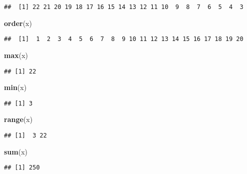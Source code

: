 \documentclass[
]{article}
\newenvironment{Shaded}{\begin{snugshade}}{\end{snugshade}}
\newcommand{\FunctionTok}[1]{\textcolor[rgb]{0.13,0.29,0.53}{\textbf{#1}}}
\newcommand{\NormalTok}[1]{#1}
\begin{document}
\begin{verbatim}
##  [1] 22 21 20 19 18 17 16 15 14 13 12 11 10  9  8  7  6  5  4  3
\end{verbatim}

\begin{Shaded}
\begin{Highlighting}[]
\FunctionTok{order}\NormalTok{(x)}
\end{Highlighting}
\end{Shaded}

\begin{verbatim}
##  [1]  1  2  3  4  5  6  7  8  9 10 11 12 13 14 15 16 17 18 19 20
\end{verbatim}

\begin{Shaded}
\begin{Highlighting}[]
\FunctionTok{max}\NormalTok{(x)}
\end{Highlighting}
\end{Shaded}

\begin{verbatim}
## [1] 22
\end{verbatim}

\begin{Shaded}
\begin{Highlighting}[]
\FunctionTok{min}\NormalTok{(x)}
\end{Highlighting}
\end{Shaded}

\begin{verbatim}
## [1] 3
\end{verbatim}

\begin{Shaded}
\begin{Highlighting}[]
\FunctionTok{range}\NormalTok{(x)}
\end{Highlighting}
\end{Shaded}

\begin{verbatim}
## [1]  3 22
\end{verbatim}

\begin{Shaded}
\begin{Highlighting}[]
\FunctionTok{sum}\NormalTok{(x)}
\end{Highlighting}
\end{Shaded}

\begin{verbatim}
## [1] 250
\end{verbatim}
\end{document}
